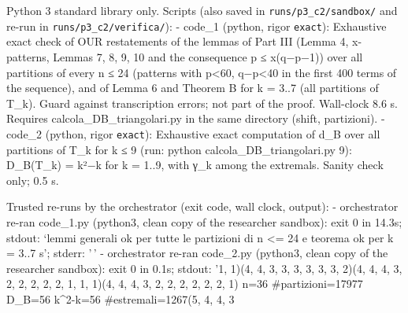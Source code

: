 Python 3 standard library only. Scripts (also saved in
\texttt{runs/p3\_c2/sandbox/} and re-run in
\texttt{runs/p3\_c2/verifica/}): - code\_1 (python, rigor
\texttt{exact}): Exhaustive exact check of OUR restatements of the
lemmas of Part III (Lemma 4, x-patterns, Lemmas 7, 8, 9, 10 and the
consequence p ≤ x(q−p−1)) over all partitions of every n ≤ 24 (patterns
with p\textless60, q−p\textless40 in the first 400 terms of the
sequence), and of Lemma 6 and Theorem B for k = 3..7 (all partitions of
T\_k). Guard against transcription errors; not part of the proof.
Wall-clock 8.6 s. Requires calcola\_DB\_triangolari.py in the same
directory (shift, partizioni). - code\_2 (python, rigor \texttt{exact}):
Exhaustive exact computation of d\_B over all partitions of T\_k for k ≤
9 (run: python calcola\_DB\_triangolari.py 9): D\_B(T\_k) = k²−k for k =
1..9, with γ\_k among the extremals. Sanity check only; 0.5 s.

Trusted re-runs by the orchestrator (exit code, wall clock, output): -
orchestrator re-ran code\_1.py (python3, clean copy of the researcher
sandbox): exit 0 in 14.3s; stdout: `lemmi generali ok per tutte le
partizioni di n \textless= 24 e teorema ok per k =
3..7 s'; stderr: '\,' - orchestrator re-ran code\_2.py
(python3, clean copy of the researcher sandbox): exit 0 in 0.1s; stdout:
'1, 1)\n    (4, 4, 3, 3, 3, 3, 3, 3, 2)\n    (4, 4, 4, 3, 2, 2, 2, 2, 2,
1, 1, 1)\n    (4, 4, 4, 3, 2, 2, 2, 2, 2, 2, 1) n=36
\#partizioni=17977 D\_B=56 k\^{}2-k=56 \#estremali=1267\n    (5, 4, 4, 3


